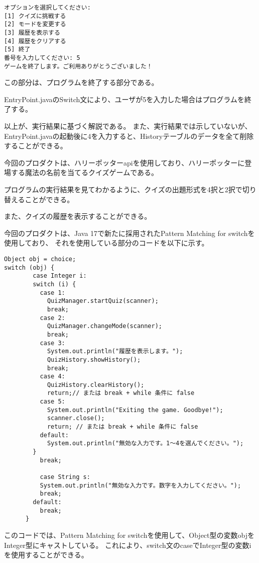 \documentclass[uplatex,dvipdfmx,a4paper]{jsarticle}
\begin{document}
\begin{lstlisting}[style=result]
  オプションを選択してください:
[1] クイズに挑戦する
[2] モードを変更する
[3] 履歴を表示する
[4] 履歴をクリアする
[5] 終了  
番号を入力してください: 5
ゲームを終了します。ご利用ありがとうございました！
\end{lstlisting}
\par この部分は、プログラムを終了する部分である。
\par EntryPoint.javaのSwitch文により、ユーザが5を入力した場合はプログラムを終了する。
\par 以上が、実行結果に基づく解説である。
また、実行結果では示していないが、EntryPoint.javaの起動後に4を入力すると、Historyテーブルのデータを全て削除することができる。
\par 今回のプロダクトは、ハリーポッターapiを使用しており、ハリーポッターに登場する魔法の名前を当てるクイズゲームである。
\par プログラムの実行結果を見てわかるように、クイズの出題形式を4択と2択で切り替えることができる。
\par また、クイズの履歴を表示することができる。
\par 今回のプロダクトは、Java 17で新たに採用されたPattern Matching for switchを使用しており、
それを使用している部分のコードを以下に示す。
\begin{lstlisting}[style=source]
  Object obj = choice;
switch (obj) {
        case Integer i:
        switch (i) {
          case 1:
            QuizManager.startQuiz(scanner);
            break;
          case 2:
            QuizManager.changeMode(scanner);
            break;
          case 3:
            System.out.println("履歴を表示します。");
            QuizHistory.showHistory();
            break;
          case 4:
            QuizHistory.clearHistory();
            return;// または break + while 条件に false
          case 5:
            System.out.println("Exiting the game. Goodbye!");
            scanner.close();
            return; // または break + while 条件に false
          default:
            System.out.println("無効な入力です。1〜4を選んでください。");
        }
          break;
      
          case String s:
          System.out.println("無効な入力です。数字を入力してください。");
          break;
        default:
          break;
      } 
\end{lstlisting}

このコードでは、Pattern Matching for switchを使用して、Object型の変数objをInteger型にキャストしている。
これにより、switch文のcaseでInteger型の変数iを使用することができる。
\end{document}
